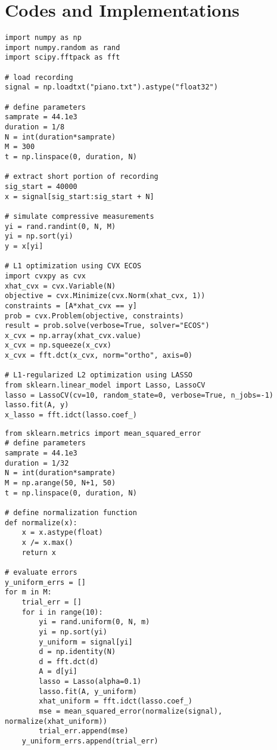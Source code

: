 \chapter{Codes and Implementations}
\label{appendix:codes}

\singlespacing
{}
\begin{lstlisting}
import numpy as np
import numpy.random as rand
import scipy.fftpack as fft

# load recording
signal = np.loadtxt("piano.txt").astype("float32")

# define parameters
samprate = 44.1e3
duration = 1/8
N = int(duration*samprate)
M = 300
t = np.linspace(0, duration, N)

# extract short portion of recording
sig_start = 40000
x = signal[sig_start:sig_start + N]

# simulate compressive measurements
yi = rand.randint(0, N, M)
yi = np.sort(yi)
y = x[yi]

# L1 optimization using CVX ECOS
import cvxpy as cvx
xhat_cvx = cvx.Variable(N)
objective = cvx.Minimize(cvx.Norm(xhat_cvx, 1))
constraints = [A*xhat_cvx == y]
prob = cvx.Problem(objective, constraints)
result = prob.solve(verbose=True, solver="ECOS")
x_cvx = np.array(xhat_cvx.value)
x_cvx = np.squeeze(x_cvx)
x_cvx = fft.dct(x_cvx, norm="ortho", axis=0)

# L1-regularized L2 optimization using LASSO
from sklearn.linear_model import Lasso, LassoCV
lasso = LassoCV(cv=10, random_state=0, verbose=True, n_jobs=-1)
lasso.fit(A, y)
x_lasso = fft.idct(lasso.coef_)
\end{lstlisting}

\begin{lstlisting}
from sklearn.metrics import mean_squared_error
# define parameters
samprate = 44.1e3
duration = 1/32
N = int(duration*samprate)
M = np.arange(50, N+1, 50)
t = np.linspace(0, duration, N)

# define normalization function
def normalize(x):
	x = x.astype(float)
	x /= x.max()
	return x

# evaluate errors
y_uniform_errs = []
for m in M:
	trial_err = []
	for i in range(10):
		yi = rand.uniform(0, N, m)
		yi = np.sort(yi)
		y_uniform = signal[yi]
		d = np.identity(N)
		d = fft.dct(d)
		A = d[yi]
		lasso = Lasso(alpha=0.1)
		lasso.fit(A, y_uniform)
		xhat_uniform = fft.idct(lasso.coef_)
		mse = mean_squared_error(normalize(signal), normalize(xhat_uniform))
		trial_err.append(mse)
	y_uniform_errs.append(trial_err)
\end{lstlisting}